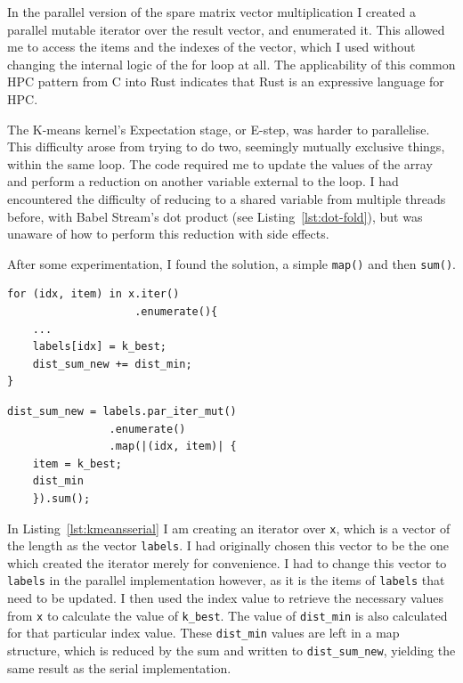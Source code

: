 In the parallel version of the spare matrix vector multiplication I created a parallel mutable iterator over the result vector, and enumerated it. This allowed me to access the items and the indexes of the vector, which I used without changing the internal logic of the for loop at all. The applicability of this common HPC pattern from C into Rust indicates that Rust is an expressive language for HPC.

The K-means kernel's Expectation stage, or E-step, was harder to parallelise. This difficulty arose from trying to do two, seemingly mutually exclusive things, within the same loop. The code required me to update the values of the array and perform a reduction on another variable external to the loop. I had encountered the difficulty of reducing to a shared variable from multiple threads before, with Babel Stream's dot product (see Listing~\ref{lst:dot-fold}), but was unaware of how to perform this reduction with side effects.

After some experimentation, I found the solution, a simple \texttt{map()} and then \texttt{sum()}. 

\begin{minipage}{.49\textwidth}
\begin{code}
\begin{verbatim}
for (idx, item) in x.iter()
                    .enumerate(){
    ...
    labels[idx] = k_best;
    dist_sum_new += dist_min;
}
\end{verbatim}
\label{lst:kmeansserial}
\end{code}
\end{minipage}\hfill
\begin{minipage}{.49\textwidth}
\begin{code}
\begin{verbatim}
dist_sum_new = labels.par_iter_mut()
                .enumerate()
                .map(|(idx, item)| {
    item = k_best;
    dist_min
    }).sum();
\end{verbatim}
\label{lst:kmeanspar}
\end{code}
\end{minipage}

In Listing~\ref{lst:kmeansserial} I am creating an iterator over \texttt{x}, which is a vector of the length as the vector \texttt{labels}. I had originally chosen this vector to be the one which created the iterator merely for convenience. I had to change this vector to \texttt{labels} in the parallel implementation however, as it is the items of \texttt{labels} that need to be updated. I then used the index value to retrieve the necessary values from \texttt{x} to calculate the value of \texttt{k\_best}. The value of \texttt{dist\_min} is also calculated for that particular index value. These \texttt{dist\_min} values are left in a map structure, which is reduced by the sum and written to \texttt{dist\_sum\_new}, yielding the same result as the serial implementation. 

